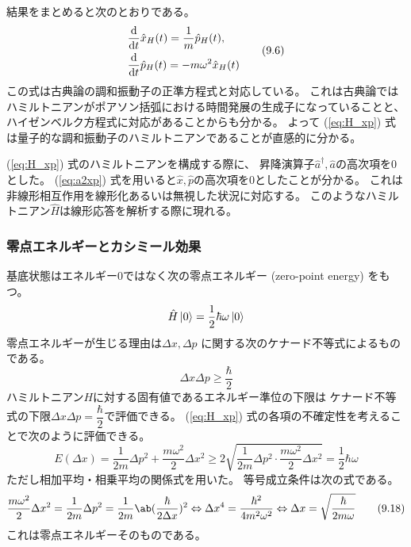 結果をまとめると次のとおりである。
\begin{equation}
  \begin{split}
    &\odv{}{t}\hat{x}_H(t)=\frac{1}{m}\hat{p}_H(t), \\
    &\odv{}{t}\hat{p}_H(t)=-m\omega^2\hat{x}_H(t)
  \end{split}
  \tag{9.6}
\end{equation}
この式は古典論の調和振動子の正準方程式と対応している。
これは古典論ではハミルトニアンがポアソン括弧における時間発展の生成子になっていることと、
ハイゼンベルク方程式に対応があることからも分かる。
よって (\ref{eq:H_xp}) 式は量子的な調和振動子のハミルトニアンであることが直感的に分かる。

(\ref{eq:H_xp}) 式のハミルトニアンを構成する際に、
昇降演算子$\hat{a}^\dagger,\hat{a}$の高次項を0とした。
(\ref{eq:a2xp}) 式を用いると$\hat{x},\hat{p}$の高次項を0としたことが分かる。
これは非線形相互作用を線形化あるいは無視した状況に対応する。
このようなハミルトニアン$\hat{H}$は線形応答を解析する際に現れる。

\subsubsection{零点エネルギーとカシミール効果}

基底状態はエネルギー0ではなく次の零点エネルギー (zero-point energy) をもつ。
\begin{equation}
  \hat{H}\ket{0} = \frac{1}{2}\hbar\omega\ket{0}
\end{equation}
零点エネルギーが生じる理由は$\Delta x,\Delta p$ に関する次のケナード不等式によるものである。
\begin{equation}
  \Delta x \Delta p\geq\frac{\hbar}{2}
\end{equation}
ハミルトニアン$H$に対する固有値であるエネルギー準位の下限は
ケナード不等式の下限$\Delta x\Delta p=\dfrac{\hbar}{2}$で評価できる。
(\ref{eq:H_xp}) 式の各項の不確定性を考えることで次のように評価できる。
\begin{equation}
  E(\Delta x)
  =\frac{1}{2m}\Delta p^2+\frac{m\omega^2}{2}\Delta x^2
  \geq2\sqrt{\frac{1}{2m}\Delta p^2\cdot\frac{m\omega^2}{2}\Delta x^2}
  =\frac{1}{2}\hbar\omega
\end{equation}
ただし相加平均・相乗平均の関係式を用いた。
等号成立条件は次の式である。
\begin{equation}
  \frac{m\omega^2}{2}\Delta x^2
  =\frac{1}{2m}\Delta p^2
  =\frac{1}{2m}\ab(\frac{\hbar}{2\Delta x})^2
  \Leftrightarrow
  \Delta x^4 = \frac{\hbar^2}{4m^2\omega^2}
  \Leftrightarrow
  \Delta x = \sqrt{\frac{\hbar}{2m\omega}}
  \tag{9.18}
\end{equation}
これは零点エネルギーそのものである。

